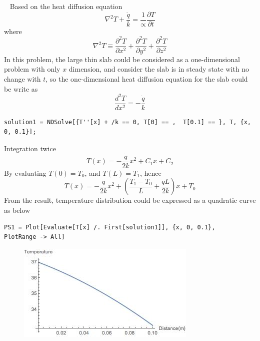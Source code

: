 \begin{solution}
~
Based on the heat diffusion equation 
$$\nabla^2 T+\frac{\dot{q}}{k}=\frac{1}{\propto}\frac{\partial T}{\partial t}$$
where
$$\nabla^2 T \equiv \frac{\partial^2 T}{\partial x^2}+
\frac{\partial^2 T}{\partial y^2}+
\frac{\partial^2 T}{\partial z^2}$$
In this problem, the large thin slab could be considered as a one-dimensional problem 
with only $x$ dimension, and consider the slab is in steady state with no change with $t$,
so the one-dimensional heat diffusion equation for the slab could be write as
$$\frac{d^2 T}{d x^2}=-\frac{\dot{q}}{k}$$
\begin{lstlisting}
solution1 = NDSolve[{T''[x] + /k == 0, T[0] == ,  T[0.1] == }, T, {x, 0, 0.1}];
\end{lstlisting}
Integration twice
$$T(x)=-\frac{\dot{q}}{2k}x^2+C_1x+C_2$$
By evaluating $T(0)=T_0$, and $T(L)=T_1$, hence
$$T(x)=-\frac{\dot{q}}{2k}x^2+ \left(\frac{T_1-T_0}{L}+\frac{\dot{q}L}{2k}\right)x+T_0$$
From the result, temperature distribution could be expressed as a quadratic curve as below
\begin{lstlisting}
PS1 = Plot[Evaluate[T[x] /. First[solution1]], {x, 0, 0.1},    PlotRange -> All]
\end{lstlisting}
\begin{figure}[h!]
  \centering
    \includegraphics[scale=0.6]{figures/ch2/7}
\end{figure}
\end{solution}

